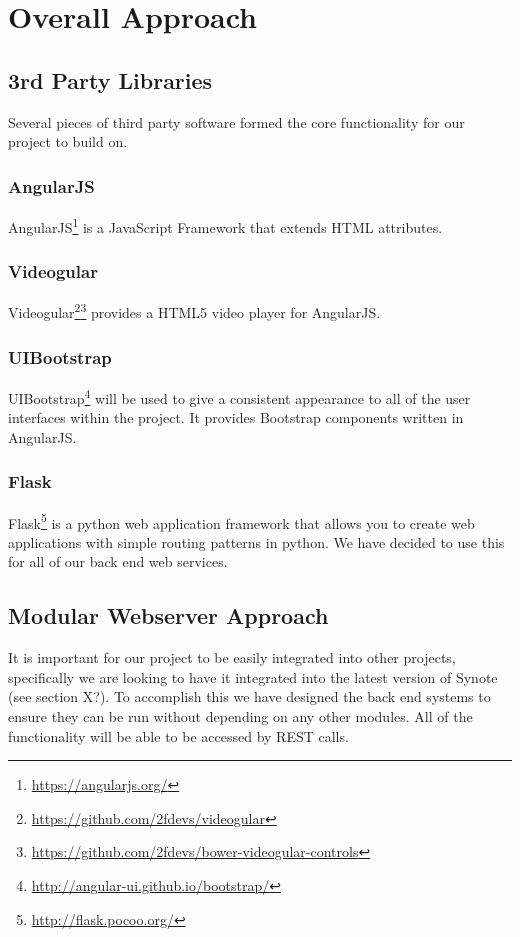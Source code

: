 \chapter{Overall Approach} 
\label{Chapter:Overall Approach}

\section{3rd Party Libraries}

Several pieces of third party software formed the core functionality for our project to build on.

\subsection{AngularJS}
\label{Section:AngularJS}
AngularJS\footnote{\url{https://angularjs.org/}} is a JavaScript Framework that extends HTML attributes.

\subsection{Videogular}
\label{Section:Videogular}
Videogular\footnote{\url{https://github.com/2fdevs/videogular}}\footnote{\url{https://github.com/2fdevs/bower-videogular-controls}} provides a HTML5 video player for AngularJS.

\subsection{UIBootstrap}
\label{Section:UIBootstrap}
UIBootstrap\footnote{\url{http://angular-ui.github.io/bootstrap/}} will be used to give a consistent appearance to all of the user interfaces within the project. It provides Bootstrap components written in AngularJS.

\subsection{Flask}
\label{Section:Flask}
Flask\footnote{\url{http://flask.pocoo.org/}} is a python web application framework that allows you to create web applications with simple routing patterns in python. We have decided to use this for all of our back end web services.

\section{Modular Webserver Approach}
\label{Section:Modular Approach}
It is important for our project to be easily integrated into other projects, specifically we are looking to have it integrated into the latest version of Synote (see section X?). To accomplish this we have designed the back end systems to ensure they can be run without depending on any other modules. All of the functionality will be able to be accessed by REST calls.

